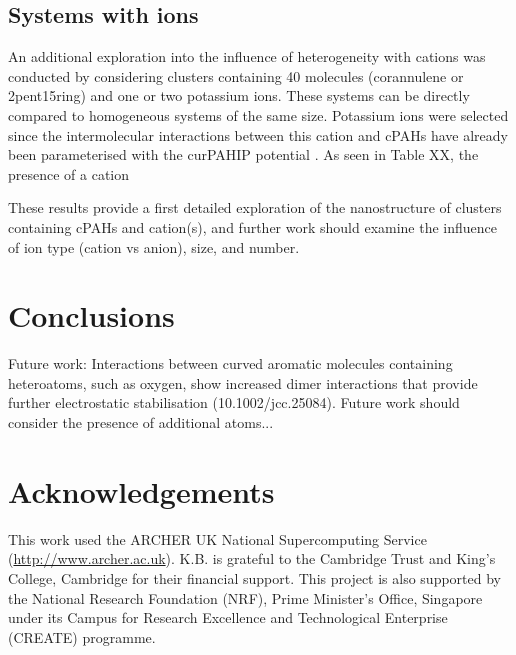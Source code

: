 
\subsection{Systems with ions}
An additional exploration into the influence of heterogeneity with cations was conducted by considering clusters containing 40 molecules (corannulene or 2pent15ring) and one or two potassium ions.  These systems can be directly compared to homogeneous systems of the same size.  Potassium ions were selected since the intermolecular interactions between this cation and cPAHs have already been parameterised with the curPAHIP potential \cite{bowal2019ion}. As seen in Table XX, the presence of a cation


These results provide a first detailed exploration of the nanostructure of clusters containing cPAHs and cation(s), and further work should examine the influence of ion type (cation vs anion), size, and number.


\section{Conclusions}

Future work:
Interactions between curved aromatic molecules containing heteroatoms, such as oxygen, show increased dimer interactions that provide further electrostatic stabilisation (10.1002/jcc.25084).  Future work should consider the presence of additional atoms...




\section*{Acknowledgements}
This work used the ARCHER UK National Supercomputing Service (\url{http://www.archer.ac.uk}).
K.B. is grateful to the Cambridge Trust and King's College, Cambridge for their financial support.
This project is also supported by the National Research Foundation (NRF), Prime Minister's Office, Singapore under its Campus for Research Excellence and Technological Enterprise (CREATE) programme.
